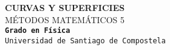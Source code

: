 \documentclass[a4paper,20pt]{article}
\begin{document}
\begin{center}

{\Huge \bf CURVAS Y SUPERFICIES}\\[0.5cm]  %
{\huge MÉTODOS MATEMÁTICOS 5}\\[1cm]  %
{\large \tt {\tt \bf Grado en Física}\\  
Universidad de Santiago de Compostela}

\end{center}
\end{document}
